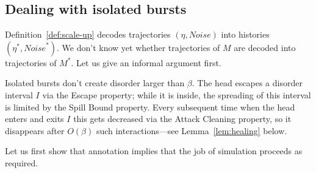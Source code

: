 \documentclass[11pt]{memoir}
\theoremstyle{definition} %
\newcommand{\Noise}{\mathit{Noise}}
\begin{document}
\subsection{Dealing with isolated bursts}\label{sec:1-level-noise}

Definition~\ref{def:scale-up} decodes trajectories \( (\eta,\Noise) \) into
histories \( (\eta^{*},\Noise^{*}) \).
We don't know yet whether trajectories of \( M \) are decoded into trajectories
of \( M^{*} \).
Let us give an informal argument first.

Isolated bursts don't create disorder larger than \( \beta \).
The head escapes a disorder interval \( I \) via the Escape property; while it is inside, the
spreading of this interval is limited by the Spill Bound property.
Every subsequent time when the head enters and exits \( I \) this gets decreased
via the Attack Cleaning property, so it disappears after \( O(\beta) \) such interactions---see
Lemma~\ref{lem:healing} below.

Let us first show that annotation implies that the job of simulation proceeds as required.
\end{document}

